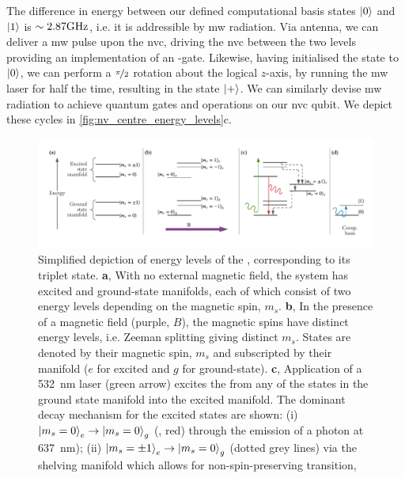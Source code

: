 The difference in energy between our defined computational basis states $\ket{0}$ and $\ket{1}$ is 
    $\sim 2.87 \textrm{GHz}$, i.e. it is addressible by \gls{mw} radiation.
Via antenna, we can deliver a \gls{mw} pulse upon the \gls{nvc}, driving the \gls{nvc} between the two levels
    providing an implementation of an -gate. 
Likewise, having initialised the state to $\ket{0}$, we can perform a $\nicefrac{\pi}{2}$ rotation 
    about the logical $z$-axis, by running the \gls{mw} laser for half the time, 
    resulting in the state $\ket{+}$. 
We can similarly devise \gls{mw} radiation to achieve quantum gates and operations on our \gls{nvc} qubit.
We depict these cycles in \cref{fig:nv_centre_energy_levels}c. 
\par

\begin{figure}[t]
    \begin{center}
        \includegraphics[width=0.95\linewidth]{experimental_study/figures/nv_centre_cartoon.pdf}
    \end{center}
    \caption[ energy levels]{
        Simplified depiction of energy levels of the , corresponding to its triplet state. 
        \textbf{a}, With no external magnetic field, the system has excited and ground-state manifolds, 
            each of which consist of two energy levels depending on the magnetic spin, $m_s$.
        \textbf{b}, In the presence of a magnetic field (purple, $B$), the magnetic spins have distinct energy levels, 
            i.e. Zeeman splitting giving distinct $m_s$. 
        States are denoted by their magnetic spin, $m_s$ and subscripted by their manifold ($e$ for excited and $g$ for ground-state). 
        \textbf{c},  Application of a \SI{532}{\nano\metre} laser (green arrow) excites the  from any of the states in the 
            ground state manifold into the excited manifold. 
        The dominant decay mechanism for the excited states are shown: 
            (i) $\ket{m_s=0}_e \rightarrow \ket{m_s=0}_g$ (, red) through the emission of a photon at \SI{637}{\nano\metre});
            (ii) $\ket{m_s=\pm 1}_e \rightarrow \ket{m_s=0}_g$ (dotted grey lines) via the shelving manifold which allows for non-spin-preserving transition, 
}
\end{figure}
